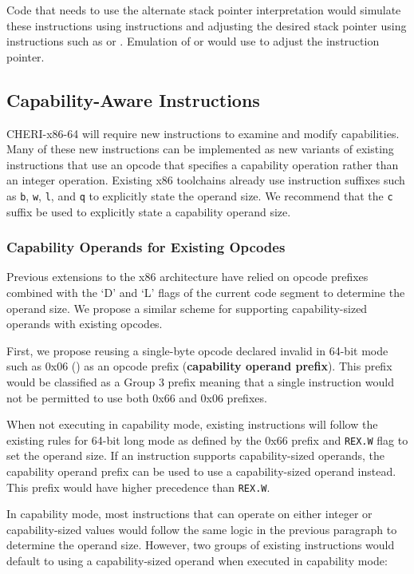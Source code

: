 Code that needs to use the alternate stack pointer
interpretation would simulate these instructions using 
instructions and adjusting the desired stack pointer using
instructions such as  or .  Emulation of
 or  would use  to
adjust the instruction pointer.

\subsection{Capability-Aware Instructions}

CHERI-x86-64 will require new instructions to examine and modify
capabilities.  Many of these new instructions can be implemented as
new variants of existing instructions that use an opcode that
specifies a capability operation rather than an integer operation.
Existing x86 toolchains already use instruction suffixes such as
\texttt{b}, \texttt{w}, \texttt{l}, and \texttt{q} to explicitly state
the operand size.  We recommend that the \texttt{c} suffix be used to
explicitly state a capability operand size.

\subsubsection{Capability Operands for Existing Opcodes}

Previous extensions to the x86 architecture have relied on opcode
prefixes combined with the `D' and `L' flags of the current code
segment to determine the operand size.  We propose a similar
scheme for supporting capability-sized operands with existing
opcodes.

First, we propose reusing a single-byte opcode declared invalid in
64-bit mode such as 0x06 () as an opcode prefix
(\textbf{capability operand prefix}).  This prefix would be classified
as a Group 3 prefix meaning that a single instruction would not be
permitted to use both 0x66 and 0x06 prefixes.

When not executing in capability mode, existing instructions will
follow the existing rules for 64-bit long mode as defined by the
0x66 prefix and \texttt{REX.W} flag to set the operand size.  If an
instruction supports capability-sized operands, the capability operand
prefix can be used to use a capability-sized operand instead.  This
prefix would have higher precedence than \texttt{REX.W}.

In capability mode, most instructions that can operate on either
integer or capability-sized values would follow the same logic in the
previous paragraph to determine the operand size.  However, two groups
of existing instructions would default to using a capability-sized
operand when executed in capability mode:

